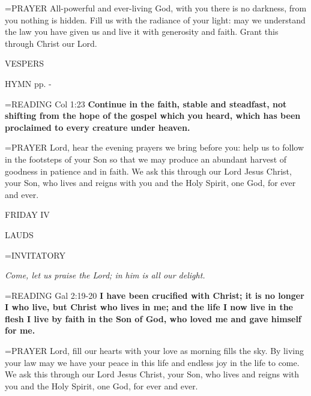 \hangindent=\parindent \small{PRAYER  All-powerful and ever-living God, with you there is no darkness, from you nothing is hidden. Fill us with the radiance of your light: may we understand the law you have given us and live it with generosity and faith. Grant this through Christ our Lord.}

\begin{flushleft}\normalsize VESPERS\\\end{flushleft}
HYMN pp. \pageref{ordinaryTime:fourthHymn} - \pageref{ordinaryTime:sixthHymn}

\hangindent=\parindent \small{READING} Col 1:23 \textbf{Continue in the faith, stable and steadfast, not shifting from the hope of the gospel which you heard, which has been proclaimed to every creature under heaven.\\}

\hangindent=\parindent \small{PRAYER  Lord, hear the evening prayers we bring before you: help us to follow in the footsteps of your Son so that we may produce an abundant harvest of goodness in patience and in faith. We ask this through our Lord Jesus Christ, your Son, who lives and reigns with you and the Holy Spirit, one God, for ever and ever.}

\begin{center}
\normalsize FRIDAY IV
\end{center}

\begin{flushleft}\normalsize LAUDS\\\end{flushleft}

\hangindent=\parindent \small{INVITATORY}
\begin{center}
\textit{Come, let us praise the Lord; in him is all our delight.\\}
\end{center}

\hangindent=\parindent \small{READING} Gal 2:19-20 \textbf{I have been crucified with Christ; it is no longer I who live, but Christ who lives in me; and the life I now live in the flesh I live by faith in the Son of God, who loved me and gave himself for me.\\}

\hangindent=\parindent \small{PRAYER  Lord, fill our hearts with your love as morning fills the sky. By living your law may we have your peace in this life and endless joy in the life to come. We ask this through our Lord Jesus Christ, your Son, who lives and reigns with you and the Holy Spirit, one God, for ever and ever.}

